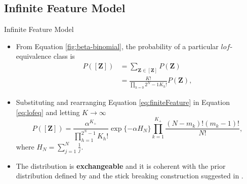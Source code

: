 \documentclass[aspectratio=169,xcolor=dvipsnames]{beamer}
\newcommand{\matz}{\textbf{Z}}
\begin{document}
\subsection{Infinite Feature Model}
\begin{frame}{Infinite Feature Model}
\setlength{\leftmargini}{0.2cm}
\vspace{-5pt}
\begin{itemize}[<+->]
\item From Equation \ref{fig:beta-binomial}, the probability of a particular $lof$-equivalence class is
\begin{align}
    P([\matz]) &= \sum_{\matz \in [\matz]} P(\matz) \nonumber\\
    &= \frac{K!}{\prod_{h=0}{2^N-1}K_h!} P(\matz), \label{eq:lofeq}
\end{align}
\item Substituting and rearranging Equation \ref{eq:finiteFeature} in Equation \ref{eq:lofeq} and letting $K\rightarrow \infty$
\begin{equation}
    P([\matz]) = \frac{\alpha^{K_+}}{\prod_{h=1}^{2^N-1}K_h!} \exp\{-\alpha H_N\} \prod_{k=1}^{K_+}\frac{(N-m_k)!(m_k-1)!}{N!}, \label{eq:infFeat}
\end{equation}
where $H_N=\sum_{j=1}^{N}\frac{1}{j}$.
\item The distribution is \textbf{exchangeable} and it is coherent with the prior distribution defined by \cite{Hjort_1990} and the stick breaking construction suggested in \cite{hjort_2007}.
\end{itemize}
\end{frame}
\end{document}
